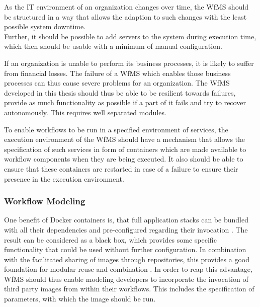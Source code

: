       As the IT environment of an organization changes over time, %
      the \ac{WfMS} should be structured in a way that allows the adaption to such changes with the least possible system downtime. \\
      Further, it should be possible to add servers to the system during execution time, which then should be usable with a minimum of manual configuration.

      If an organization is unable to perform its business processes, it is likely to suffer from financial losses. The failure of a \ac{WfMS} which enables those business processes can thus cause severe problems for an organization. The \ac{WfMS} developed in this thesis should thus be able to be resilient towards failures, \ie provide as much functionality as possible if a part of it fails and try to recover autonomously. This requires well separated modules.

      To enable workflows to be run in a specified environment of services, the execution environment of the \ac{WfMS} should have a mechanism that allows the specification of such services in form of containers which are made available to workflow components when they are being executed. It also should be able to ensure that these containers are restarted in case of a failure to ensure their presence in the execution environment.


  \subsubsection{Workflow Modeling} %
    \label{ssub:workflow_modeling}

      One benefit of Docker containers is, that full application stacks can be bundled with all their dependencies and pre-configured regarding their invocation \cite[p.~82]{Bernstein2014Containers}. The result can be considered as a black box, which provides some specific functionality that could be used without further configuration. In combination with the facilitated sharing of images through repositories, this provides a good foundation for modular reuse and combination \cite[p.~6]{Boettiger2015Introduction}.
      In order to reap this advantage, \ac{WfMS} should thus enable modeling developers to incorporate the invocation of third party images from within their workflows. This includes the specification of parameters, with which the image should be run.

